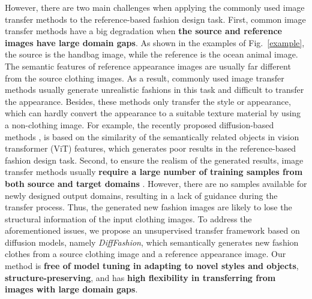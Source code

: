 However, there are two main challenges when applying the commonly used image transfer methods to the reference-based fashion design task.
First, common image transfer methods have a big degradation when \textbf{the source and reference images have large domain gaps}. As shown in the examples of Fig.~\ref{example}, the source is the handbag image, while the reference is the ocean animal image. The semantic features of reference appearance images are usually far different from the source clothing images. 
As a result, commonly used image transfer methods usually generate unrealistic fashions in this task and difficult to transfer the appearance. Besides, these methods only transfer the style or appearance, which can hardly convert the appearance to a suitable texture material by using a non-clothing image. 
For example, the recently proposed diffusion-based methods \cite{kwon2022diffusion}, is based on the similarity of the semantically related objects in vision transformer (ViT) \cite{amir2021deep} features, which generates poor results in the reference-based fashion design task.
Second, to ensure the realism of the generated results, image transfer methods usually \textbf{require a large number of training samples from both source and target domains} \cite{saharia2022palette}. However, there are no samples available for newly designed output domains, resulting in a lack of guidance during the transfer process. Thus, the generated new fashion images are likely to lose the structural information of the input clothing images.
To address the aforementioned issues, we propose an unsupervised transfer framework based on diffusion models, namely \textit{DiffFashion}, which semantically generates new fashion clothes from a source clothing image and a reference appearance image. 
Our method is \textbf{free of model tuning in adapting to novel styles and objects}, \textbf{structure-preserving}, and has \textbf{high flexibility in transferring from images with large domain gaps}.
